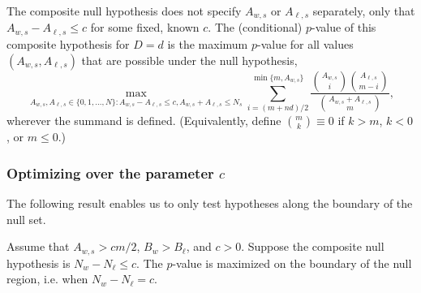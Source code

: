 The composite null hypothesis does not specify $A_{w,s}$ or $A_{\ell,s}$ separately, only 
that $A_{w,s} - A_{\ell,s} \le c$ for
some fixed, known $c$.
The (conditional) $p$-value of this composite hypothesis for $D=d$ is the maximum $p$-value for all
values $(A_{w,s}, A_{\ell,s})$ that are possible under the null hypothesis,
\begin{equation}
  \max_{A_{w,s}, A_{\ell,s} \in \{0, 1, \ldots, N \}: A_{w,s} - A_{\ell,s} \le c, A_{w,s} + A_{\ell,s} \le N_s}
   \sum_{i = (m+nd)/2}^{\min\{m, A_{w,s}\}} \frac{ {A_{w,s} \choose i}{A_{\ell,s} \choose m-i} }{{A_{w,s} + A_{\ell, s} \choose m}},
\end{equation}
wherever the summand is defined. 
(Equivalently, define ${m \choose k} \equiv 0$ if $k > m$, $k < 0$, or $m \le 0$.)

\subsubsection{Optimizing over the parameter $c$}
The following result enables us to only test hypotheses along the boundary of the null set.

\begin{thm}
Assume that $A_{w,s} > cm/2$, $B_w > B_\ell$, and $c>0$.
Suppose the composite null hypothesis is $N_w - N_\ell \leq c$.
The $p$-value is maximized on the boundary of the null region, i.e. when $N_w - N_\ell = c$.
\end{thm}


